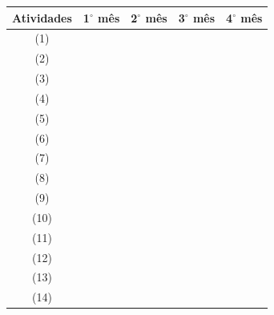 \documentclass[11pt]{article}
\begin{document}
\begin{table}[h]
\centering
	\begin{tabular}{| c || c | c | c | c |}
	\hline 
	Atividades & 1$^{\circ}$ mês & 2$^{\circ}$ mês & 3$^{\circ}$ mês & 4$^{\circ}$ mês \\ \hline \hline
	(1) & \cellcolor{gray} &  &  & \\ \hline
	(2) & \cellcolor{gray} &  &  & \\ \hline
	(3) & \cellcolor{gray} &  &  & \\ \hline
	(4) & \cellcolor{gray} &  &  & \\ \hline
	(5) &  & \cellcolor{gray} &  & \\ \hline
	(6) &  & \cellcolor{gray} &  & \\ \hline
	(7) &  & \cellcolor{gray} &  & \\ \hline
	(8) &  &  & \cellcolor{gray} & \\ \hline
	(9) &  &  & \cellcolor{gray} & \\ \hline
	(10) &  &  & \cellcolor{gray} & \\ \hline
	(11) &  &  & \cellcolor{gray} & \\ \hline
	(12) &  &  &  & \cellcolor{gray} \\ \hline
	(13) &  &  &  & \cellcolor{gray} \\ \hline
	(14) &  &  &  & \cellcolor{gray} \\ 
	\hline
	\end{tabular}
\end{table}
	

{}



\end{document}
